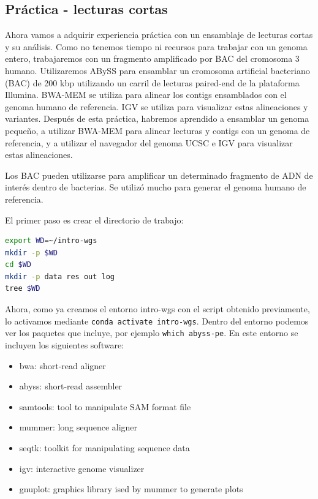 \subsection{Práctica - lecturas cortas}
Ahora vamos a adquirir experiencia práctica con un ensamblaje de lecturas cortas y su análisis.
Como no tenemos tiempo ni recursos para trabajar con un genoma entero, trabajaremos con un fragmento amplificado por BAC del cromosoma 3 humano.
Utilizaremos ABySS para ensamblar un cromosoma artificial bacteriano (BAC) de 200 kbp utilizando un carril de lecturas paired-end de la plataforma Illumina. BWA-MEM se utiliza para alinear los contigs ensamblados con el genoma humano de referencia. IGV se utiliza para visualizar estas alineaciones y variantes.
Después de esta práctica, habremos aprendido a ensamblar un genoma pequeño, a utilizar BWA-MEM para alinear lecturas y contigs con un genoma de referencia, y a utilizar el navegador del genoma UCSC e IGV para visualizar estas alineaciones.

Los BAC pueden utilizarse para amplificar un determinado fragmento de ADN de interés dentro de bacterias. Se utilizó mucho para generar el genoma humano de referencia.

El primer paso es crear el directorio de trabajo:
\begin{lstlisting}[language=bash]
export WD=~/intro-wgs 
mkdir -p $WD
cd $WD
mkdir -p data res out log 
tree $WD
\end{lstlisting}

Ahora, como ya creamos el entorno intro-wgs con el script obtenido previamente, lo activamos mediante \texttt{conda activate intro-wgs}. Dentro del entorno podemos ver los paquetes que incluye, por ejemplo \texttt{which abyss-pe}. En este entorno se incluyen los siguientes software:
\begin{itemize}
\item bwa: short-read aligner
\item abyss: short-read assembler
\item samtools: tool to manipulate SAM format file
\item mummer: long sequence aligner
\item seqtk: toolkit for manipulating sequence data
\item igv: interactive genome visualizer
\item gnuplot: graphics library ised by mummer to generate plots
\end{itemize}

